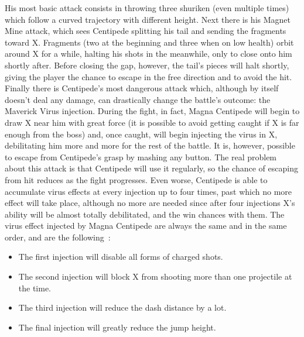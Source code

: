 His most basic attack consists in throwing three shuriken (even multiple times) which follow a curved trajectory with different height. Next there is his Magnet Mine attack, which sees Centipede splitting his tail and sending the fragments toward X. Fragments (two at the beginning and three when on low health) orbit around X for a while, halting his shots in the meanwhile, only to close onto him shortly after. Before closing the gap, however, the tail's pieces will halt shortly, giving the player the chance to escape in the free direction and to avoid the hit. Finally there is Centipede's most dangerous attack which, although by itself doesn't deal any damage, can drastically change the battle's outcome: the Maverick Virus injection. During the fight, in fact, Magna Centipede will begin to draw X near him with great force (it is possible to avoid getting caught if X is far enough from the boss) and, once caught, will begin injecting the virus in X, debilitating him more and more for the rest of the battle. It is, however, possible to escape from Centipede's grasp by mashing any button. The real problem about this attack is that Centipede will use it regularly, so the chance of escaping from hit reduces as the fight progresses. Even worse, Centipede is able to accumulate virus effects at every injection up to four times, past which no more effect will take place, although no more are needed since after four injections X's ability will be almost totally debilitated, and the win chances with them. The virus effect injected by Magna Centipede are always the same and in the same order, and are the following~\cite{wiki:Magna_centipede}:
\begin{itemize}
	\item The first injection will disable all forms of charged shots.
	\item The second injection will block X from shooting more than one projectile at the time.
	\item The third injection will reduce the dash distance by a lot.
	\item The final injection will greatly reduce the jump height.
\end{itemize}

